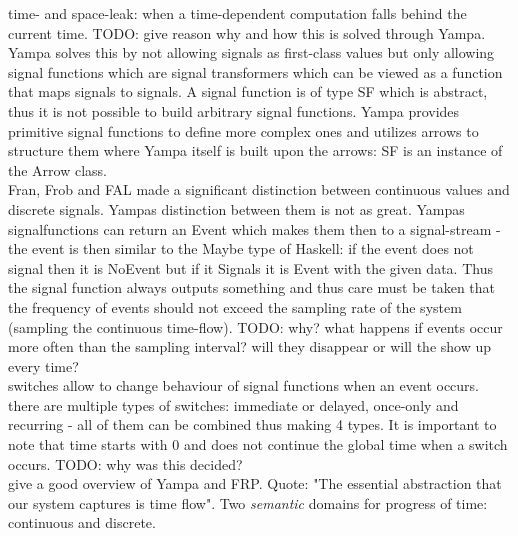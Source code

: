 \documentclass{article}
\begin{document}
time- and space-leak: when a time-dependent computation falls behind the current time. TODO: give reason why and how this is solved through Yampa. \\
Yampa solves this by not allowing signals as first-class values but only allowing signal functions which are signal transformers which can be viewed as a function that maps signals to signals. A signal function is of type SF which is abstract, thus it is not possible to build arbitrary signal functions. Yampa provides primitive signal functions to define more complex ones and utilizes arrows \cite{Hughes2004} to structure them where Yampa itself is built upon the arrows: SF is an instance of the Arrow class. \\

Fran, Frob and FAL made a significant distinction between continuous values and discrete signals. Yampas distinction between them is not as great. Yampas signalfunctions can return an Event which makes them then to a signal-stream - the event is then similar to the Maybe type of Haskell: if the event does not signal then it is NoEvent but if it Signals it is Event with the given data. Thus the signal function always outputs something and thus care must be taken that the frequency of events should not exceed the sampling rate of the system (sampling the continuous time-flow). TODO: why? what happens if events occur more often than the sampling interval? will they disappear or will the show up every time? \\

switches allow to change behaviour of signal functions when an event occurs. there are multiple types of switches: immediate or delayed, once-only and recurring - all of them can be combined thus making 4 types. It is important to note that time starts with 0 and does not continue the global time when a switch occurs. TODO: why was this decided? \\

\cite{Nilsson2002} give a good overview of Yampa and FRP. Quote: "The essential abstraction that our system captures is time flow". Two \textit{semantic} domains for progress of time: continuous and discrete. \\
\end{document}
